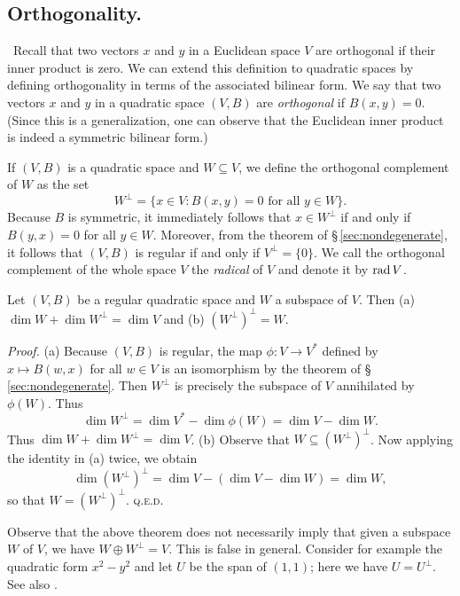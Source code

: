 \subsection{Orthogonality.}~Recall that two vectors \(x\) and \(y\) in a
Euclidean space \(V\) are orthogonal if their inner product is zero. We can
extend this definition to quadratic spaces by defining orthogonality in terms of
the associated bilinear form. We say that two vectors \(x\) and \(y\) in a
quadratic space \((V, B)\) are \emph{orthogonal} if \(B(x, y) = 0\). (Since this
is a generalization, one can observe that the Euclidean inner product is indeed
a symmetric bilinear form.)\label{sec:orthogonality}

If \((V, B)\) is a quadratic space and \(W \subseteq V\), we define the
orthogonal complement of \(W\) as the set
\[
  W^{\perp} = \{x \in V : B(x, y) = 0 \text{ for all } y \in W\}.
\]
Because \(B\) is symmetric, it immediately follows that \(x \in W^{\perp}\) if
and only if \(B(y, x) = 0\) for all \(y \in W\). Moreover, from the theorem of
\S\,\ref{sec:nondegenerate}, it follows that \((V,B)\) is regular if and only if
\(V^{\perp} = \{0\}\). We call the orthogonal complement of the whole space
\(V\) the \emph{radical} of \(V\) and denote it by \(\operatorname{rad} V\).

\begin{theorem}\label{thm:orthogonal-complement} {\normalfont
    \cite[p.~7]{lam1973quadratic}} Let \((V, B)\) be a regular quadratic space
    and \(W\) a subspace of \(V\). Then {\normalfont (a)} \(\dim W + \dim
    W^{\perp} = \dim V\) and {\normalfont (b)} \((W^{\perp})^{\perp} = W\).
\end{theorem}

\emph{Proof.} (a) Because \((V, B)\) is regular, the map \(\phi: V \to V^*\)
defined by \(x \mapsto B(w, x)\) for all \(w \in V\) is an isomorphism by the
theorem of \S\,\ref{sec:nondegenerate}. Then \(W^{\perp}\) is precisely the
subspace of \(V\) annihilated by \(\phi(W)\). Thus
\[
    \dim W^{\perp} = \dim V^* - \dim \phi(W) = \dim V - \dim W.
\]
Thus \(\dim W + \dim W^{\perp} = \dim V\). (b) Observe that \(W \subseteq
(W^{\perp})^{\perp}\). Now applying the identity in (a) twice, we obtain
\[
  \dim (W^{\perp})^{\perp} = \dim V - (\dim V - \dim W) = \dim W,
\]
so that \(W = (W^{\perp})^{\perp}\). {\scshape q.e.d.}

Observe that the above theorem does not necessarily imply that given a subspace
\(W\) of \(V\), we have \(W \oplus W^{\perp} = V\). This is false in general.
Consider for example the quadratic form \(x^2 - y^2\) and let \(U\) be the span
of \((1, 1)\); here we have \(U = U^{\perp}\). See also \cite{ormsbynotes}.

